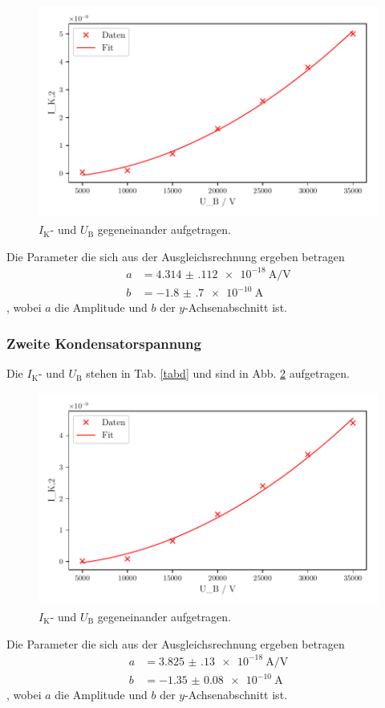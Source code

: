 

\begin{figure}
    \centering
    \includegraphics[width=12cm, height=7cm]{build/plot3.pdf}
    \caption{$I_\text{K}$- und $U_\text{B}$ gegeneinander aufgetragen.
    }
    \label{fig:plot3}
\end{figure}


Die Parameter die sich aus der Ausgleichsrechnung ergeben betragen
\begin{align*}
    a &= \SI{4.314(112)e-18}{\ampere\per\volt}\\
    b &= \SI{-1.8(7)e-10}{\ampere} 
\end{align*}, wobei $a$ die Amplitude und $b$ der $y$-Achsenabschnitt ist. 

\subsubsection{Zweite Kondensatorspannung}
Die $I_\text{K}$- und $U_\text{B}$ stehen in Tab. \ref{tabd} und sind in Abb. \ref{fig:plot4} aufgetragen. 

\begin{figure}
    \centering
    \includegraphics[width=12cm, height=7cm]{build/plot4.pdf}
    \caption{$I_\text{K}$- und $U_\text{B}$ gegeneinander aufgetragen.
    }
    \label{fig:plot4}
\end{figure}


Die Parameter die sich aus der Ausgleichsrechnung ergeben betragen
\begin{align*}
    a &= \SI{3.825(130)e-18}{\ampere\per\volt}\\
    b &= \SI{-1.35(8)e-10}{\ampere} 
\end{align*}, wobei $a$ die Amplitude und $b$ der $y$-Achsenabschnitt ist. 
